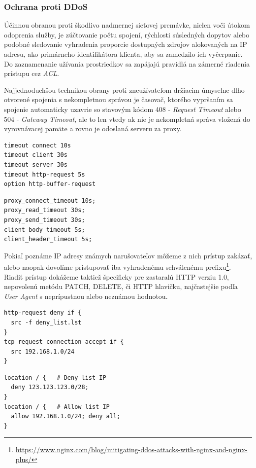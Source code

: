 \documentclass[12pt, a4paper]{article}
\begin{document}
\subsubsection{Ochrana proti DDoS}
Účinnou obranou proti škodlivo nadmernej sieťovej premávke, nielen voči útokom odoprenia služby, je 
zúčtovanie počtu spojení, rýchlosti súsledných dopytov alebo podobné sledovanie vyhradenia proporcie
dostupných zdrojov alokovaných na IP adresu, ako primárneho identifikátora klienta, aby
sa zamedzilo ich vyčerpanie. Do zaznamenanie užívania prostriedkov sa zapájajú pravidlá na zámerné
riadenia prístupu cez \emph{ACL}. 

Najjednoduchšou technikou obrany proti zneužívateľom držiacim úmyselne  dlho otvorené spojenia s 
nekompletnou správou je časovač, ktorého vypršaním sa spojenie automaticky uzavrie so stavovým kódom 408 - 
\emph{Request Timeout} alebo 504 - \emph{Gateway Timeout}, ale to len vtedy ak nie je nekompletná správa 
vložená do vyrovnávacej pamäte a rovno je odoslaná serveru za proxy.

\noindent\begin{minipage}{.48\textwidth}
\begin{lstlisting}[caption=HAProxy: timeout časovače]
timeout connect 10s
timeout client 30s
timeout server 30s
timeout http-request 5s
option http-buffer-request
\end{lstlisting}
\end{minipage}\hfill
\begin{minipage}{.48\textwidth}
\begin{lstlisting}[caption=NGINX: timeout časovače]
proxy_connect_timeout 10s; 
proxy_read_timeout 30s;
proxy_send_timeout 30s; 
client_body_timeout 5s;
client_header_timeout 5s;
\end{lstlisting}
\end{minipage}

Pokiaľ poznáme IP adresy známych narušovateľov môžeme z nich prístup zakázať, alebo naopak dovolíme
pristupovať iba vyhradenému schválenému prefixu\footnote{\url{https://www.nginx.com/blog/mitigating-ddos-attacks-with-nginx-and-nginx-plus/}}. Riadiť prístup dokážeme taktiež špecificky
pre zastaralú HTTP verziu 1.0, nepovolenú metódu PATCH, DELETE, či HTTP hlavičku, najčastejšie podľa 
\emph{User Agent} s neprípustnou alebo neznámou hodnotou.

\noindent\begin{minipage}{.48\textwidth}
\begin{lstlisting}[caption=Haproxy: ACL pre zdrojové adresy]
http-request deny if { 
  src -f deny_list.lst 
}
tcp-request connection accept if { 
  src 192.168.1.0/24
}
\end{lstlisting}
\end{minipage}\hfill
\begin{minipage}{.48\textwidth}
\begin{lstlisting}[caption=NGINX: ACL pre zdrojové adresy]
location / {   # Deny list IP
  deny 123.123.123.0/28; 
}          
location / {   # Allow list IP
  allow 192.168.1.0/24; deny all; 
}
\end{lstlisting}
\end{minipage}
\end{document}
